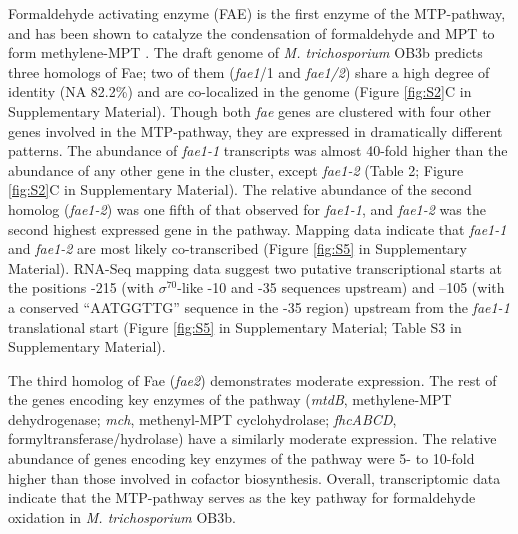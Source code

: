 Formaldehyde activating enzyme (FAE) is the first enzyme of the MTP-pathway, and has been shown to catalyze the condensation of formaldehyde and MPT to form methylene-MPT \cite{vorholt2000}.
The draft genome of \textit{M. trichosporium} OB3b predicts three homologs of Fae; two of them (\textit{fae1}/1 and \textit{fae1/2}) share a high degree of identity (NA 82.2\%) and are co-localized in the genome (Figure \ref{fig:S2}C in Supplementary Material).
Though both \textit{fae} genes are clustered with four other genes involved in the MTP-pathway, they are expressed in dramatically different patterns.
The abundance of \textit{fae1-1} transcripts was almost 40-fold higher than the abundance of any other gene in the cluster, except \textit{fae1-2} (Table 2; Figure \ref{fig:S2}C in Supplementary Material).
The relative abundance of the second homolog (\textit{fae1-2}) was one fifth of that observed for \textit{fae1-1}, and \textit{fae1-2} was the second highest expressed gene in the pathway.
Mapping data indicate that \textit{fae1-1} and \textit{fae1-2} are most likely co-transcribed (Figure \ref{fig:S5} in Supplementary Material).
RNA-Seq mapping data suggest two putative transcriptional starts at the positions -215 (with $\sigma^{70}$-like -10 and -35 sequences upstream) and –105 (with a conserved “AATGGTTG” sequence in the -35 region) upstream from the \textit{fae1-1} translational start (Figure \ref{fig:S5} in Supplementary Material; Table S3 in Supplementary Material).

The third homolog of Fae (\textit{fae2}) demonstrates moderate expression.
The rest of the genes encoding key enzymes of the pathway (\textit{mtdB}, methylene-MPT dehydrogenase; \textit{mch}, methenyl-MPT cyclohydrolase; \textit{fhcABCD}, formyltransferase/hydrolase) have a similarly moderate expression.
The relative abundance of genes encoding key enzymes of the pathway were 5- to 10-fold higher than those involved in cofactor biosynthesis.
Overall, transcriptomic data indicate that the MTP-pathway serves as the key pathway for formaldehyde oxidation in \textit{M. trichosporium} OB3b.

